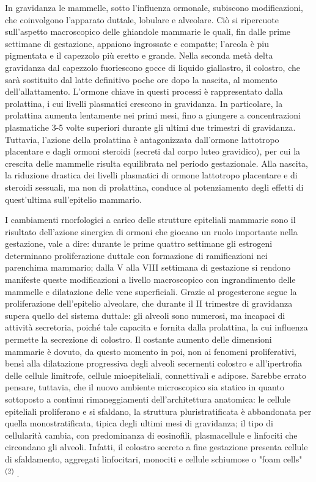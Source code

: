 \documentclass[]{article}
\begin{document}
In gravidanza le mammelle, sotto l'influenza ormonale, subiscono
modificazioni, che coinvolgono l'apparato duttale, lobulare e alveolare.
Ciò si ripercuote sull'aspetto macroscopico delle ghiandole mammarie le
quali, fin dalle prime settimane di gestazione, appaiono ingrossate e
compatte; l'areola è piu pigmentata e il capezzolo più eretto e grande.
Nella seconda metà delta gravidanza dal capezzolo fuoriescono gocce di
liquido giallastro, il colostro, che sarà sostituito dal latte
definitivo poche ore dopo la nascita, al momento dell'allattamento.
L'ormone chiave in questi processi è rappresentato dalla prolattina, i
cui livelli plasmatici crescono in gravidanza. In particolare, la
prolattina aumenta lentamente nei primi mesi, fino a giungere a
concentrazioni plasmatiche 3-5 volte superiori durante gli ultimi due
trimestri di gravidanza. Tuttavia, l'azione della prolattina è
antagonizzata dall'ormone lattotropo placentare e dagli ormoni steroidi
(secreti dal corpo luteo gravidico), per cui la crescita delle mammelle
risulta equilibrata nel periodo gestazionale. Alla nascita, la riduzione
drastica dei livelli plasmatici di ormone lattotropo placentare e di
steroidi sessuali, ma non di prolattina, conduce al potenziamento degli
effetti di quest'ultima sull'epitelio mammario.

I cambiamenti rnorfologici a carico delle strutture epiteliali mammarie
sono il risultato dell'azione sinergica di ormoni che giocano un ruolo
importante nella gestazione, vale a dire: durante le prime quattro
settimane gli estrogeni determinano proliferazione duttale con
formazione di ramificazioni nei parenchima mammario; dalla V alla VIII
settimana di gestazione si rendono manifeste queste modificazioni a
livello macroscopico con ingrandimento delle mammelle e dilatazione
delle vene superficiali. Grazie al progesterone segue la proliferazione
dell'epitelio alveolare, che durante il II trimestre di gravidanza
supera quello del sistema duttale: gli alveoli sono numerosi, ma
incapaci di attività secretoria, poiché tale capacita e fornita dalla
prolattina, la cui influenza permette la secrezione di colostro. Il
costante aumento delle dimensioni mammarie è dovuto, da questo momento
in poi, non ai fenomeni proliferativi, bensì alla dilatazione
progressiva degli alveoli secernenti colostro e all'ipertrofia delle
cellule limitrofe, cellule mioepiteliali, connettivali e adipose.
Sarebbe errato pensare, tuttavia, che il nuovo ambiente microscopico sia
statico in quanto sottoposto a continui rimaneggiamenti
dell'architettura anatomica: le cellule epiteliali proliferano e si
sfaldano, la struttura pluristratificata è abbandonata per quella
monostratificata, tipica degli ultimi mesi di gravidanza; il tipo di
cellularità cambia, con predominanza di eosinofili, plasmacellule e
linfociti che circondano gli alveoli. Infatti, il colostro secreto a
fine gestazione presenta cellule di sfaldamento, aggregati linfocitari,
monociti e cellule schiumose o "foam cells" \textsuperscript{(2)} .
\end{document}
